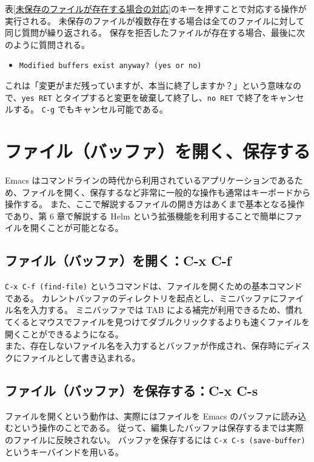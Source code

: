表\ref{未保存のファイルが存在する場合の対応}のキーを押すことで対応する操作が実行される。
未保存のファイルが複数存在する場合は全てのファイルに対して同じ質問が繰り返される。
保存を拒否したファイルが存在する場合、最後に次のように質問される。
\begin{itemize}\setlength{\leftskip}{-1.00zw}%
\item[] \texttt{Modified buffers exist anyway? (yes or no)}
\end{itemize}
これは「変更がまだ残っていますが、本当に終了しますか？」という意味なので、\texttt{yes RET} とタイプすると変更を破棄して終了し、\texttt{no RET} で終了をキャンセルする。
\texttt{C-g} でもキャンセル可能である。
\section{ファイル（バッファ）を開く、保存する}
Emacs はコマンドラインの時代から利用されているアプリケーションであるため、ファイルを開く、保存するなど非常に一般的な操作も通常はキーボードから操作する。
また、ここで解説するファイルの開き方はあくまで基本となる操作であり、第 6 章で解説する Helm という拡張機能を利用することで簡単にファイルを開くことが可能となる。
\subsection{ファイル（バッファ）を開く：C-x C-f}
\texttt{C-x C-f (find-file)} というコマンドは、ファイルを開くための基本コマンドである。
カレントバッファのディレクトリを起点とし、ミニバッファにファイル名を入力する。
ミニバッファでは TAB による補完が利用できるため、慣れてくるとマウスでファイルを見つけてダブルクリックするよりも速くファイルを開くことができるようになる。\\

また、存在しないファイル名を入力するとバッファが作成され、保存時にディスクにファイルとして書き込まれる。
\subsection{ファイル（バッファ）を保存する：C-x C-s}
ファイルを開くという動作は、実際にはファイルを Emacs のバッファに読み込むという操作のことである。
従って、編集したバッファは保存するまでは実際のファイルに反映されない。
バッファを保存するには \texttt{C-x C-s (save-buffer)} というキーバインドを用いる。\\

